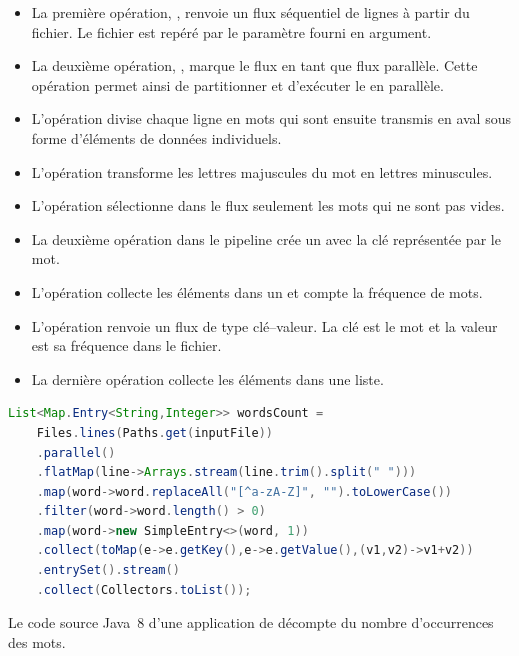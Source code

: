 \begin{itemize}
	\item La premi\`ere op\'eration, , renvoie un flux s\'equentiel de lignes \`a partir du fichier. Le fichier est rep\'er\'e par le param\`etre  fourni en argument.

	\item La deuxi\`eme op\'eration, , marque le flux en tant que flux parall\`ele. Cette op\'eration permet ainsi de partitionner et d'ex\'ecuter le  en parall\`ele.

	\item L'op\'eration  divise chaque ligne en mots qui sont ensuite transmis en aval sous forme d'\'el\'ements de donn\'ees individuels.
	
	\item L'op\'eration  transforme les lettres majuscules du mot en lettres minuscules.
	
	\item L'op\'eration  s\'electionne dans le flux seulement les mots qui ne sont pas vides.
	
	\item La deuxi\`eme op\'eration  dans le pipeline cr\'ee un  avec la cl\'e repr\'esent\'ee par le mot.
	
	\item L'op\'eration  collecte les \'el\'ements dans un  et compte la fr\'equence de mots.
	
	\item L'op\'eration  renvoie un flux de type cl\'e--valeur. La cl\'e est le mot et la valeur est sa fr\'equence dans le fichier.
	
	\item La derni\`ere op\'eration  collecte les \'el\'ements dans une liste.
	
	
\end{itemize}





\begin{Listing}[tbp]
\begin{lstlisting}[language=java]
  List<Map.Entry<String,Integer>> wordsCount = 
	Files.lines(Paths.get(inputFile))
    .parallel()
    .flatMap(line->Arrays.stream(line.trim().split(" ")))
    .map(word->word.replaceAll("[^a-zA-Z]", "").toLowerCase())
    .filter(word->word.length() > 0)
    .map(word->new SimpleEntry<>(word, 1))
    .collect(toMap(e->e.getKey(),e->e.getValue(),(v1,v2)->v1+v2))
    .entrySet().stream()
    .collect(Collectors.toList());
\end{lstlisting}
\caption{Le code source Java~8 d'une application de d\'ecompte du nombre d'occurrences des mots.}
\label{wordCountJava}
\end{Listing}





